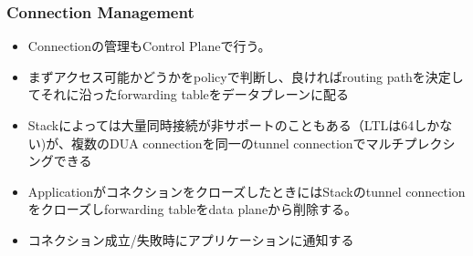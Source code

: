 \documentclass[dvipdfmx,9pt,notheorems]{beamer}
\theoremstyle{definition}
\begin{document}
%
%

\begin{frame}\frametitle{Connection Management}
	\begin{itemize}
		\item Connectionの管理もControl Planeで行う。
		\item まずアクセス可能かどうかをpolicyで判断し、良ければrouting pathを決定してそれに沿ったforwarding tableをデータプレーンに配る
		\item Stackによっては大量同時接続が非サポートのこともある（LTLは64しかない)が、複数のDUA connectionを同一のtunnel connectionでマルチプレクシングできる
		\item ApplicationがコネクションをクローズしたときにはStackのtunnel connectionをクローズしforwarding tableをdata planeから削除する。
		\item コネクション成立/失敗時にアプリケーションに通知する
	\end{itemize}
\pnote{
}
\end{frame}
\end{document}
